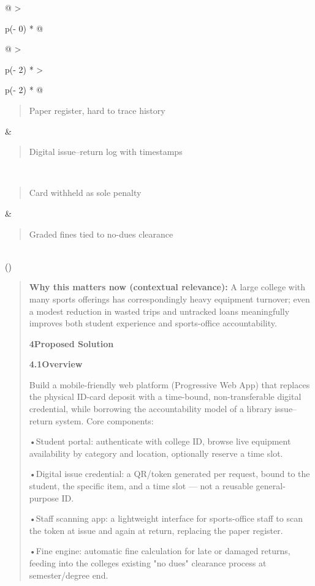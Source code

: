 \documentclass[
]{article}
\begin{document}
\begin{longtable}[]{@{}
  >{\raggedright\arraybackslash}p{(\columnwidth - 0\tabcolsep) * }@{}}
\begin{minipage}[b]{\linewidth}
\begin{longtable}[]{@{}
  >{\raggedright\arraybackslash}p{(\columnwidth - 2\tabcolsep) * }
  >{\raggedright\arraybackslash}p{(\columnwidth - 2\tabcolsep) * }@{}}
\begin{minipage}[t]{\linewidth}
\begin{quote}
Paper register, hard to trace history
\end{quote}
\end{minipage} & \begin{minipage}[t]{\linewidth}\raggedright
\begin{quote}
Digital issue--return log with timestamps
\end{quote}
\end{minipage} \\
\begin{minipage}[t]{\linewidth}\raggedright
\begin{quote}
Card withheld as sole penalty
\end{quote}
\end{minipage} & \begin{minipage}[t]{\linewidth}\raggedright
\begin{quote}
Graded fines tied to no-dues clearance
\end{quote}
\end{minipage} \\
\bottomrule()
\end{longtable}

\begin{quote}
\textbf{Why this matters now (contextual relevance):} A large college
with many sports offerings has correspondingly heavy equipment turnover;
even a modest reduction in wasted trips and untracked loans meaningfully
improves both student experience and sports-office accountability.

\textbf{4Proposed Solution}

\textbf{4.1Overview}

Build a mobile-friendly web platform (Progressive Web App) that replaces
the physical ID-card deposit with a time-bound, non-transferable digital
credential, while borrowing the accountability model of a library
issue--return system. Core components:

•Student portal: authenticate with college ID, browse live equipment
availability by category and location, optionally reserve a time slot.

•Digital issue credential: a QR/token generated per request, bound to
the student, the specific item, and a time slot --- not a reusable
general-purpose ID.

•Staff scanning app: a lightweight interface for sports-office staff to
scan the token at issue and again at return, replacing the paper
register.

•Fine engine: automatic fine calculation for late or damaged returns,
feeding into the college\textquotesingle s existing "no dues" clearance
process at semester/degree end.


\end{quote}
\end{minipage}
\end{longtable}
\end{document}
